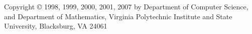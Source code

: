 


Copyright {\copyright} 1998, 1999, 2000, 2001, 2007 by
        Department of Computer Science,
        and Department of Mathematics,
        Virginia Polytechnic Institute and State University,
        Blacksburg, VA  24061

